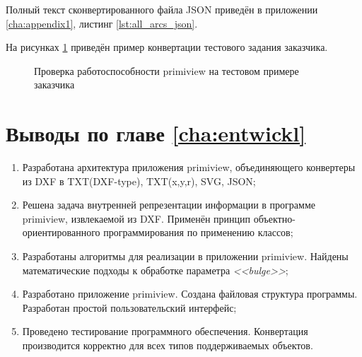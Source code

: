 Полный текст сконвертированного файла JSON приведён в приложении \ref{cha:appendix1}, листинг \ref{lst:all_arcs_json}.

На рисунках \ref{fig:tests} приведён пример конвертации тестового задания заказчика.

\begin{figure}[H]
	\centering
	\begin{minipage}[h]{0.3\linewidth}
	\end{minipage}
	\begin{minipage}[h]{0.6\linewidth}
	\end{minipage}
	\begin{minipage}[h]{0.4\linewidth}
	\end{minipage}
	\begin{minipage}[h]{0.4\linewidth}
	\end{minipage}
	\begin{minipage}[h]{0.4\linewidth}
	\end{minipage}
	\begin{minipage}[h]{0.4\linewidth}
	\end{minipage}
	\caption{Проверка работоспособности primiview на тестовом примере заказчика}
	\label{fig:tests}
\end{figure}

\section{Выводы по главе \ref{cha:entwickl}}

\begin{enumerate}[1)]
	\item Разработана архитектура приложения primiview, объединяющего конвертеры из DXF в TXT(DXF-type), TXT(x,y,r), SVG, JSON;
	\item Решена задача внутренней репрезентации информации в программе primiview, извлекаемой из DXF. Применён принцип объектно-ориентированного программирования по применению классов;
	\item Разработаны алгоритмы для реализации в приложении primiview. Найдены математические подходы к обработке параметра \textit{<<bulge>>};
	\item Разработано приложение primiview. Создана файловая структура программы. Разработан простой пользовательский интерфейс;
	\item Проведено тестирование программного обеспечения. Конвертация производится корректно для всех типов поддерживаемых объектов.
\end{enumerate}
